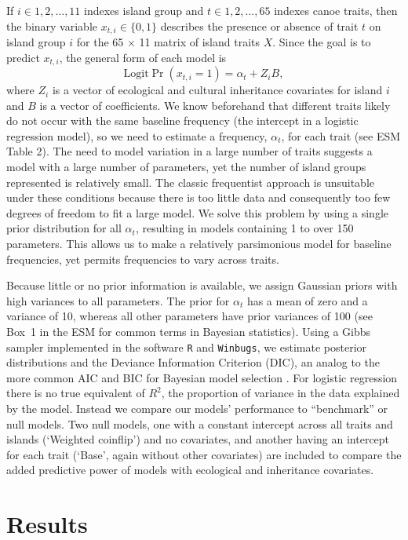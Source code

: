 \documentclass[11pt]{article}
\begin{document}
If $i \in {1,2,\dots ,11}$ indexes island group and $t \in {1,2, \dots , 65}$ indexes canoe traits, then the binary variable $x_{t,i} \in \{0,1\}$ describes the presence or absence of trait $t$ on island group $i$ for the 65 $\times$ 11 matrix of island traits $X$. Since the goal is to predict $x_{t,i}$, the general form of each model is
\[
  \mathrm{Logit} \Pr( x_{t,i}=1 ) = \alpha_t + Z_i B,
\]
where $Z_i$ is a vector of ecological and cultural inheritance covariates for island $i$ and $B$ is a vector of coefficients. We know beforehand that different traits likely do not occur with the same baseline frequency (the intercept in a logistic regression model), so we need to estimate a frequency, $\alpha_t$, for each trait (see ESM Table 2). The need to model variation in a large number of traits suggests a model with a large number of parameters, yet the number of island groups represented is relatively small. The classic frequentist approach is unsuitable under these conditions because there is too little data and consequently too few degrees of freedom to fit a large model. We solve this problem by using a single prior distribution for all $\alpha_t$, resulting in models containing 1 to over 150 parameters. This allows us to make a relatively parsimonious model for baseline frequencies, yet permits frequencies to vary across traits.

Because little or no prior information is available, we assign Gaussian priors with high variances to all parameters. The prior for $\alpha_t$ has a mean of zero and a variance of 10, whereas all other parameters have prior variances of 100 (see Box~1 in the ESM for common terms in Bayesian statistics). Using a Gibbs sampler implemented in the software \texttt{R} and \texttt{Winbugs}, we estimate posterior distributions and the Deviance Information Criterion (DIC), an analog to the more common AIC and BIC for Bayesian model selection \citep{Spiegelhalter2002, Gill2008}. For logistic regression there is no true equivalent of $R^2$, the proportion of variance in the data explained by the model. Instead we compare our models' performance to ``benchmark'' or null models. Two null models, one with a constant intercept across all traits and islands (`Weighted coinflip') and no covariates, and another having an intercept for each trait (`Base', again without other covariates) are included to compare the added predictive power of models with ecological and inheritance covariates.


\section{Results}
\end{document}
